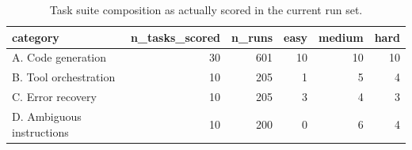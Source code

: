 \begin{table}
\caption{Task suite composition as actually scored in the current run set.}
\label{tab:table1_task_suite}
\begin{tabular}{lrrrrr}
\toprule
category & n_tasks_scored & n_runs & easy & medium & hard \\
\midrule
A. Code generation & 30 & 601 & 10 & 10 & 10 \\
B. Tool orchestration & 10 & 205 & 1 & 5 & 4 \\
C. Error recovery & 10 & 205 & 3 & 4 & 3 \\
D. Ambiguous instructions & 10 & 200 & 0 & 6 & 4 \\
\bottomrule
\end{tabular}
\end{table}
